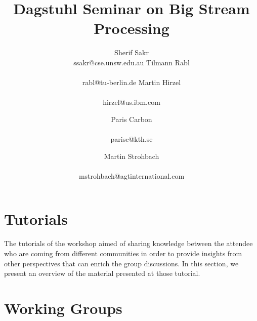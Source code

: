 \documentclass[preprint]{sig-alternate-10pt}
\begin{document}
\title{Dagstuhl Seminar on Big Stream Processing}

\newcommand*{\emailn}[1]{\textsf{\normalsize #1}}

\author{
\alignauthor
Sherif Sakr\\
  \emailn{ssakr@cse.unsw.edu.au}
\alignauthor
Tilmann Rabl\\
  \\
  \emailn{rabl@tu-berlin.de}
\alignauthor
Martin Hirzel\\
  \\
  \emailn{hirzel@us.ibm.com}
\and
\alignauthor
Paris Carbon\\
  \\
  \emailn{parisc@kth.se}
\and
\alignauthor
Martin Strohbach\\
  \\
  \emailn{mstrohbach@agtinternational.com}}


\maketitle



\section{Tutorials}
The tutorials of the workshop aimed of sharing knowledge between the attendee who are coming from different communities in order to provide insights from other perspectives that can enrich the group discussions. In this section,
we present an overview of the material presented at those tutorial.





\section{Working Groups}





\balance

\end{document}
